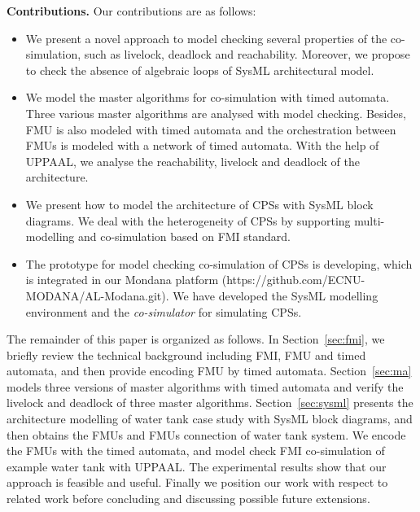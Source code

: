 \textbf{Contributions.} Our contributions are as follows:
\begin{itemize}
\item
We present a novel approach to model checking several properties of the co-simulation, such as livelock, deadlock and reachability. Moreover, we propose to check the absence of algebraic loops of SysML architectural model.
\item
We model the master algorithms for co-simulation with timed automata. Three various master algorithms are analysed with model checking. Besides, FMU is also modeled with timed automata and the orchestration between FMUs is modeled with a network of timed automata. With the help of UPPAAL, we analyse the reachability, livelock and deadlock of the architecture.
\item
We present how to model the architecture of CPSs with SysML block diagrams. We deal with the heterogeneity of CPSs by supporting multi-modelling and co-simulation based on FMI standard.
\item
The prototype for model checking co-simulation of CPSs is developing, which is integrated in our Mondana platform \cite{Cheng2015Modana}(https://github.com/ECNU-MODANA/AL-Modana.git). We have developed the SysML modelling environment and the \textit{co-simulator }for simulating CPSs\cite{Fritzson1998Modelica}.
\end{itemize}
The remainder of this paper is organized as follows. In Section~\ref{sec:fmi}, we briefly review the technical background including FMI, FMU and timed automata, and then provide encoding FMU by timed automata.
Section~\ref{sec:ma} models three versions of master algorithms with timed automata and verify the livelock and deadlock of three master algorithms.
Section~\ref{sec:sysml} presents the architecture modelling of water tank case study with SysML block diagrams, and then obtains the FMUs and FMUs connection of water tank system. We encode the FMUs with the timed automata, and model check FMI co-simulation of example water tank with UPPAAL. The experimental results show that our approach is feasible and useful. 
Finally we position our work with respect to related work before concluding and discussing possible future extensions.




















